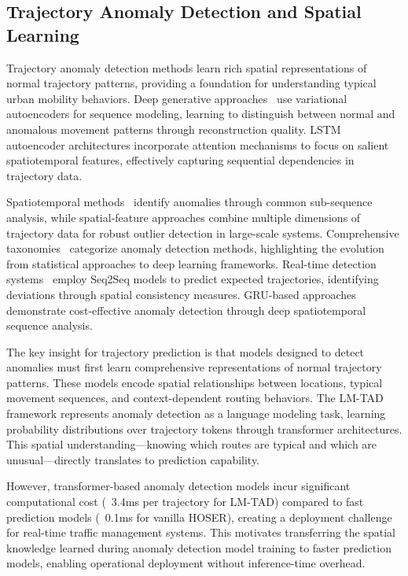 \subsection{Trajectory Anomaly Detection and Spatial Learning}
\label{sec:lit-anomaly-spatial}

Trajectory anomaly detection methods learn rich spatial representations of normal trajectory patterns, providing a foundation for understanding typical urban mobility behaviors. Deep generative approaches~\cite{liuOnlineAnomalousTrajectory2020} use variational autoencoders for sequence modeling, learning to distinguish between normal and anomalous movement patterns through reconstruction quality. LSTM autoencoder architectures incorporate attention mechanisms to focus on salient spatiotemporal features, effectively capturing sequential dependencies in trajectory data.

Spatiotemporal methods~\cite{heSpatiotemporalTrajectoryAnomaly2022} identify anomalies through common sub-sequence analysis, while spatial-feature approaches combine multiple dimensions of trajectory data for robust outlier detection in large-scale systems. Comprehensive taxonomies~\cite{kongMobileTrajectoryAnomaly2024} categorize anomaly detection methods, highlighting the evolution from statistical approaches to deep learning frameworks. Real-time detection systems~\cite{huRealtimeTaxiSpatial2024} employ Seq2Seq models to predict expected trajectories, identifying deviations through spatial consistency measures. GRU-based approaches~\cite{tangLowcostHighperformanceAbnormal2024} demonstrate cost-effective anomaly detection through deep spatiotemporal sequence analysis.

The key insight for trajectory prediction is that models designed to detect anomalies must first learn comprehensive representations of normal trajectory patterns. These models encode spatial relationships between locations, typical movement sequences, and context-dependent routing behaviors. The LM-TAD framework represents anomaly detection as a language modeling task, learning probability distributions over trajectory tokens through transformer architectures. This spatial understanding—knowing which routes are typical and which are unusual—directly translates to prediction capability.

However, transformer-based anomaly detection models incur significant computational cost (~3.4ms per trajectory for LM-TAD) compared to fast prediction models (~0.1ms for vanilla HOSER), creating a deployment challenge for real-time traffic management systems. This motivates transferring the spatial knowledge learned during anomaly detection model training to faster prediction models, enabling operational deployment without inference-time overhead.


